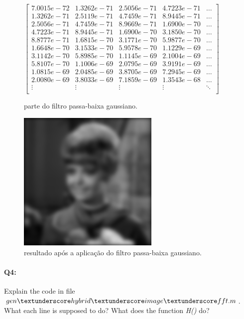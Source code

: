 \begin{figure}[!htb]
	\centering
	$
	\begin{bmatrix}
	    7.0015e-72  & 1.3262e-71 & 2.5056e-71 & 4.7223e-71 & \dots \\
	    1.3262e-71  & 2.5119e-71 & 4.7459e-71 & 8.9445e-71 & \dots \\
   		2.5056e-71  & 4.7459e-71 & 8.9669e-71 & 1.6900e-70 & \dots \\
   		4.7223e-71  & 8.9445e-71 & 1.6900e-70 & 3.1850e-70 & \dots \\
   		8.8777e-71  & 1.6815e-70 & 3.1771e-70 & 5.9877e-70 & \dots \\
   		1.6648e-70  & 3.1533e-70 & 5.9578e-70 & 1.1229e-69 & \dots \\
   		3.1142e-70  & 5.8985e-70 & 1.1145e-69 & 2.1004e-69 & \dots \\
   		5.8107e-70  & 1.1006e-69 & 2.0795e-69 & 3.9191e-69 & \dots \\
   		1.0815e-69  & 2.0485e-69 & 3.8705e-69 & 7.2945e-69 & \dots \\
   		2.0080e-69  & 3.8033e-69 & 7.1859e-69 & 1.3543e-68 & \dots \\
   		\vdots & \vdots & \vdots & \vdots & \ddots\\
	\end{bmatrix}
	$
	\caption{parte do filtro passa-baixa gaussiano.}
\end{figure}

\begin{figure}[!htb]
  \centering
  \includegraphics[scale=0.5]{final.png}
  \caption{resultado após a aplicação do filtro passa-baixa gaussiano.}
\end{figure}


\pagebreak
\paragraph{Q4:} Explain the code in file \emph{$gen\textunderscore hybrid\textunderscore image\textunderscore fft.m$}. What each line is supposed to do? What does the function \emph{H()} do?


